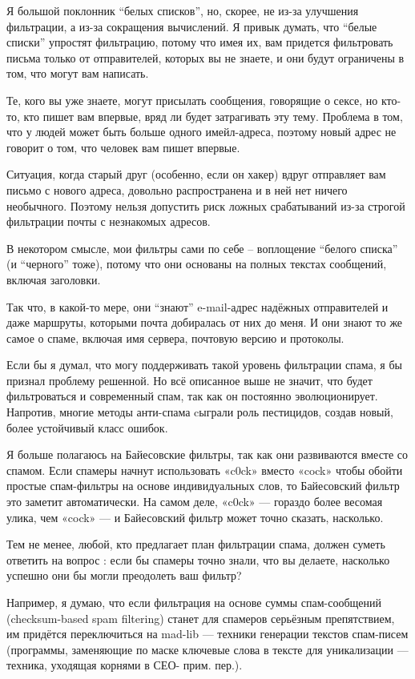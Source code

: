 \documentclass[ebook,12pt,oneside,openany]{memoir}
\begin{document}
Я большой поклонник “белых списков”, но, скорее, не из-за улучшения
фильтрации, а из-за сокращения вычислений. Я привык думать, что “белые
списки” упростят фильтрацию, потому что имея их, вам придется
фильтровать письма только от отправителей, которых вы не знаете, и они
будут ограничены в том, что могут вам написать.

Те, кого вы уже знаете, могут присылать сообщения, говорящие о сексе,
но кто-то, кто пишет вам впервые, вряд ли будет затрагивать эту тему.
Проблема в том, что у людей может быть больше одного имейл-адреса,
поэтому новый адрес не говорит о том, что человек вам пишет впервые.

Ситуация, когда старый друг (особенно, если он хакер) вдруг отправляет
вам письмо с нового адреса, довольно распространена и в ней нет ничего
необычного. Поэтому нельзя допустить риск ложных срабатываний из-за
строгой фильтрации почты с незнакомых адресов.

В некотором смысле, мои фильтры сами по себе – воплощение “белого
списка” (и “черного” тоже), потому что они основаны на полных текстах
сообщений, включая заголовки.

Так что, в какой-то мере, они “знают” e-mail-адрес надёжных
отправителей и даже маршруты, которыми почта добиралась от них до
меня. И они знают то же самое о спаме, включая имя сервера, почтовую
версию и протоколы.

Если бы я думал, что могу поддерживать такой уровень фильтрации спама,
я бы признал проблему решенной. Но всё описанное выше не значит, что
будет фильтроваться и современный спам, так как он постоянно
эволюционирует. Напротив, многие методы анти-спама cыграли роль
пестицидов, создав новый, более устойчивый класс ошибок.

Я больше полагаюсь на Байесовские фильтры, так как они развиваются
вместе со спамом. Если спамеры начнут использовать «c0ck» вместо
«cock» чтобы обойти простые спам-фильтры на основе индивидуальных
слов, то Байесовский фильтр это заметит автоматически. На самом деле,
«c0ck» — гораздо более весомая улика, чем «cock» — и Байесовский
фильтр может точно сказать, насколько.

Тем не менее, любой, кто предлагает план фильтрации спама, должен
суметь ответить на вопрос : если бы спамеры точно знали, что вы
делаете, насколько успешно они бы могли преодолеть ваш фильтр?

Например, я думаю, что если фильтрация на основе суммы спам-сообщений
(checksum-based spam filtering) станет для спамеров серьёзным
препятствием, им придётся переключиться на mad-lib — техники генерации
текстов спам-писем (программы, заменяющие по маске ключевые слова в
тексте для уникализации — техника, уходящая корнями в СЕО- прим.
пер.).
\end{document}

